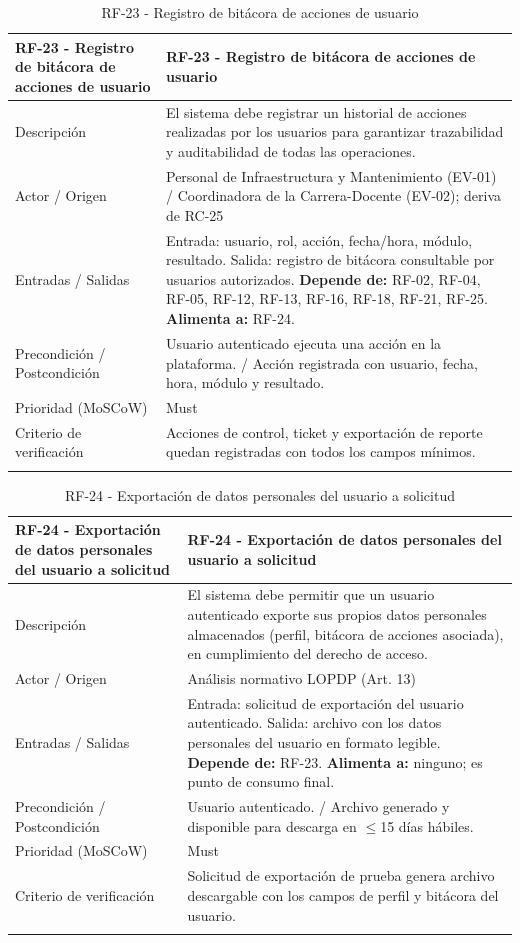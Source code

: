 \begingroup
\small
\begin{longtable}{|P{0.5000}|P{0.5000}|}
\hline
RF-23 - Registro de bitácora de acciones de usuario & RF-23 - Registro de bitácora de acciones de usuario \\ \hline
Descripción & El sistema debe registrar un historial de acciones realizadas por los usuarios para garantizar trazabilidad y auditabilidad de todas las operaciones. \\ \hline
Actor / Origen & Personal de Infraestructura y Mantenimiento (EV-01) / Coordinadora de la Carrera-Docente (EV-02); deriva de RC-25 \\ \hline
Entradas / Salidas & Entrada: usuario, rol, acción, fecha/hora, módulo, resultado. Salida: registro de bitácora consultable por usuarios autorizados. \textbf{Depende de:} RF-02, RF-04, RF-05, RF-12, RF-13, RF-16, RF-18, RF-21, RF-25. \textbf{Alimenta a:} RF-24. \\ \hline
Precondición / Postcondición & Usuario autenticado ejecuta una acción en la plataforma. / Acción registrada con usuario, fecha, hora, módulo y resultado. \\ \hline
Prioridad (MoSCoW) & Must \\ \hline
Criterio de verificación & Acciones de control, ticket y exportación de reporte quedan registradas con todos los campos mínimos. \\ \hline
\caption{RF-23 - Registro de bitácora de acciones de usuario}
\end{longtable}
\endgroup

\begingroup
\small
\begin{longtable}{|P{0.5000}|P{0.5000}|}
\hline
RF-24 - Exportación de datos personales del usuario a solicitud & RF-24 - Exportación de datos personales del usuario a solicitud \\ \hline
Descripción & El sistema debe permitir que un usuario autenticado exporte sus propios datos personales almacenados (perfil, bitácora de acciones asociada), en cumplimiento del derecho de acceso. \\ \hline
Actor / Origen & Análisis normativo LOPDP (Art. 13) \\ \hline
Entradas / Salidas & Entrada: solicitud de exportación del usuario autenticado. Salida: archivo con los datos personales del usuario en formato legible. \textbf{Depende de:} RF-23. \textbf{Alimenta a:} ninguno; es punto de consumo final. \\ \hline
Precondición / Postcondición & Usuario autenticado. / Archivo generado y disponible para descarga en $\leq$15 días hábiles. \\ \hline
Prioridad (MoSCoW) & Must \\ \hline
Criterio de verificación & Solicitud de exportación de prueba genera archivo descargable con los campos de perfil y bitácora del usuario. \\ \hline
\caption{RF-24 - Exportación de datos personales del usuario a solicitud}
\end{longtable}
\endgroup


